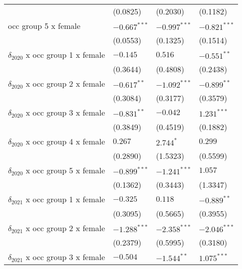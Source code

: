 \begin{tabular}{llll}
                                       &           (0.0825) &           (0.2030) &           (0.1182) \\
occ group 5 x female                   &     $-0.667^{***}$ &     $-0.997^{***}$ &     $-0.821^{***}$ \\
                                       &           (0.0553) &           (0.1325) &           (0.1514) \\
$\delta_{2020}$ x occ group 1 x female &           $-0.145$ &            $0.516$ &      $-0.551^{**}$ \\
                                       &           (0.3644) &           (0.4808) &           (0.2438) \\
$\delta_{2020}$ x occ group 2 x female &      $-0.617^{**}$ &     $-1.092^{***}$ &      $-0.899^{**}$ \\
                                       &           (0.3084) &           (0.3177) &           (0.3579) \\
$\delta_{2020}$ x occ group 3 x female &      $-0.831^{**}$ &           $-0.042$ &      $1.231^{***}$ \\
                                       &           (0.3849) &           (0.4519) &           (0.1882) \\
$\delta_{2020}$ x occ group 4 x female &            $0.267$ &          $2.744^*$ &            $0.299$ \\
                                       &           (0.2890) &           (1.5323) &           (0.5599) \\
$\delta_{2020}$ x occ group 5 x female &     $-0.899^{***}$ &     $-1.241^{***}$ &            $1.057$ \\
                                       &           (0.1362) &           (0.3443) &           (1.3347) \\
$\delta_{2021}$ x occ group 1 x female &           $-0.325$ &            $0.118$ &      $-0.889^{**}$ \\
                                       &           (0.3095) &           (0.5665) &           (0.3955) \\
$\delta_{2021}$ x occ group 2 x female &     $-1.288^{***}$ &     $-2.358^{***}$ &     $-2.046^{***}$ \\
                                       &           (0.2379) &           (0.5995) &           (0.3180) \\
$\delta_{2021}$ x occ group 3 x female &           $-0.504$ &      $-1.544^{**}$ &      $1.075^{***}$ \\

\end{tabular}
